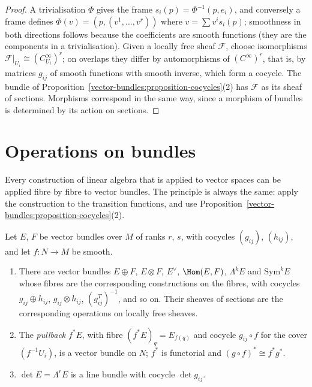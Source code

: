 \begin{proof}
A trivialisation $\Phi$ gives the frame $s_i(p) = \Phi^{-1}(p, e_i)$, and conversely a frame defines $\Phi(v) = (p, (v^1, \ldots, v^r))$ where $v = \sum v^is_i(p)$; smoothness in both directions follows because
the coefficients are smooth functions (they are the components in a trivialisation). Given a locally free sheaf $\mathcal{F}$, choose isomorphisms $\mathcal{F}|_{U_i} \cong (C^\infty_{U_i})^r$; on overlaps
they differ by automorphisms of $(C^\infty)^r$, that is, by matrices $g_{ij}$ of smooth functions with smooth inverse, which form a cocycle. The bundle of
Proposition~\ref{vector-bundles:proposition-cocycles}(2) has $\mathcal{F}$ as its sheaf of sections. Morphisms correspond in the same way, since a morphism of bundles is determined by its action on sections.
\end{proof}

\section{Operations on bundles}\label{vector-bundles:section-operations}

Every construction of linear algebra that is applied to vector spaces can be applied fibre by fibre to vector bundles. The principle is always the same: apply the construction to
the transition functions, and use Proposition~\ref{vector-bundles:proposition-cocycles}(2).

\begin{proposition}\label{vector-bundles:proposition-operations}
Let $E$, $F$ be vector bundles over $M$ of ranks $r$, $s$, with cocycles $(g_{ij})$, $(h_{ij})$, and let $f \colon N \to M$ be smooth.
\begin{enumerate}
\item There are vector bundles $E \oplus F$, $E \otimes F$, $E^\vee$, $\Hom(E, F)$, $\Lambda^kE$ and $\mathrm{Sym}^kE$ whose fibres are the corresponding constructions on the fibres, with cocycles
$g_{ij} \oplus h_{ij}$, $g_{ij} \otimes h_{ij}$, $(g_{ij}^T)^{-1}$, and so on. Their sheaves of sections are the corresponding operations on locally free sheaves.
\item The \emph{pullback} $f^*E$, with fibre $(f^*E)_q = E_{f(q)}$ and cocycle $g_{ij} \circ f$ for the cover $(f^{-1}U_i)$, is a vector bundle on $N$; $f^*$ is functorial and
$(g \circ f)^* \cong f^*g^*$.
\item $\det E = \Lambda^rE$ is a line bundle with cocycle $\det g_{ij}$.
\end{enumerate}
\end{proposition}

